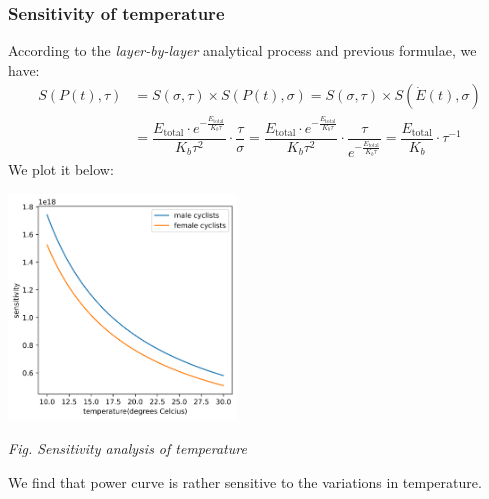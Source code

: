 \documentclass{article}
\begin{document}
			\subsubsection{Sensitivity of temperature}
				According to the \textit{layer-by-layer} analytical process and previous formulae, we have:
				\[
					\begin{aligned}
						S\left( P\left( t \right) ,\tau \right) &=S\left( \sigma ,\tau \right) \times S\left( P\left( t \right) ,\sigma \right) =S\left( \sigma ,\tau \right) \times S\left( \dot{E}\left( t \right) ,\sigma \right) \\
						&= \dfrac{E_{\mathrm{total}}\cdot e^{-\frac{E_{\mathrm{total}}}{K_b\tau}}}{K_b\tau ^2}\cdot \dfrac{\tau}{\sigma}=\dfrac{E_{\mathrm{total}}\cdot e^{-\frac{E_{\mathrm{total}}}{K_b\tau}}}{K_b\tau ^2}\cdot \dfrac{\tau}{e^{-\frac{E_{\mathrm{total}}}{K_b\tau}}}=\dfrac{E_{\mathrm{total}}}{K_b}\cdot \tau ^{-1}
					\end{aligned}
				\]
				We plot it below:
				\begin{center}
					\includegraphics[height = 6cm]{sensitivity analysis of temperature.png}

					\small\textit{Fig. Sensitivity analysis of temperature}
				\end{center}
				We find that power curve is rather sensitive to the variations in temperature.
\end{document}
